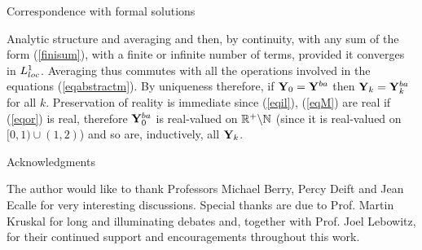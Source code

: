 \documentclass[12pt]{article}
\begin{document}
\begin{subsection}{Correspondence with formal solutions}
\begin{subsection}{Analytic structure and averaging}
\z and then, by continuity, with any sum
of the form (\ref{finisum}), with a finite or infinite number of terms, 
provided it converges in ${L}^1_{loc}$. Averaging
thus commutes with all the operations
involved in the equations (\ref{eqabstractm}).
By uniqueness therefore, if ${\bf Y}_0={\bf Y}^{ba}$ 
then  ${\bf Y}_k={\bf Y}_k^{ba}$ for all $k$. Preservation of reality is
immediate since (\ref{eqil}), (\ref{eqM}) are real if (\ref{eqor}) is real, therefore
${\bf Y}_0^{ba}$ is real-valued on $\mathbb{R}^+\backslash\mathbb{N}$ (since it is real-valued on
$[0,1)\cup(1,2)$) and so are, inductively, all ${\bf Y}_k$.





\end{subsection}
 






\end{subsection}
\begin{section}{Acknowledgments}

The author would like
to thank Professors Michael Berry, Percy Deift and  Jean Ecalle
for very interesting discussions. Special thanks are due to 
Prof. Martin Kruskal for long and illuminating debates
and, together with Prof. Joel Lebowitz, for their
continued support and encouragements throughout this work.
\end{section}

\setcounter{section}{0}
\renewcommand{\thesection}{\Alph{section}}
\end{document}
